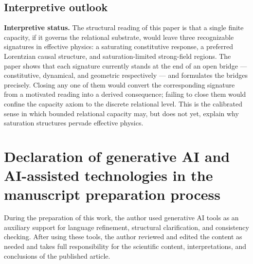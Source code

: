 \documentclass[epj]{svjour}
\begin{document}
  \subsection{Interpretive outlook}
    \label{subsec:interpretive-outlook}

    \textbf{Interpretive status.}
    The structural reading of this paper is that a single finite capacity, if it governs the
    relational substrate, would leave three recognizable signatures in effective physics: a
    saturating constitutive response, a preferred Lorentzian causal structure, and
    saturation-limited strong-field regions.
    The paper shows that each signature currently stands at the end of an open bridge ---
    constitutive, dynamical, and geometric respectively --- and formulates the bridges precisely.
    Closing any one of them would convert the corresponding signature from a motivated reading into
    a derived consequence; failing to close them would confine the capacity axiom to the discrete
    relational level.
    This is the calibrated sense in which bounded relational capacity may, but does not yet,
    explain why saturation structures pervade effective physics.

  \section*{Declaration of generative AI and AI-assisted technologies in the manuscript preparation process}
  During the preparation of this work, the author used generative AI tools
  as an auxiliary support for language refinement, structural clarification,
  and consistency checking.
  After using these tools, the author reviewed and edited the content as needed
  and takes full responsibility for the scientific content, interpretations,
  and conclusions of the published article.

  
  
\end{document}
